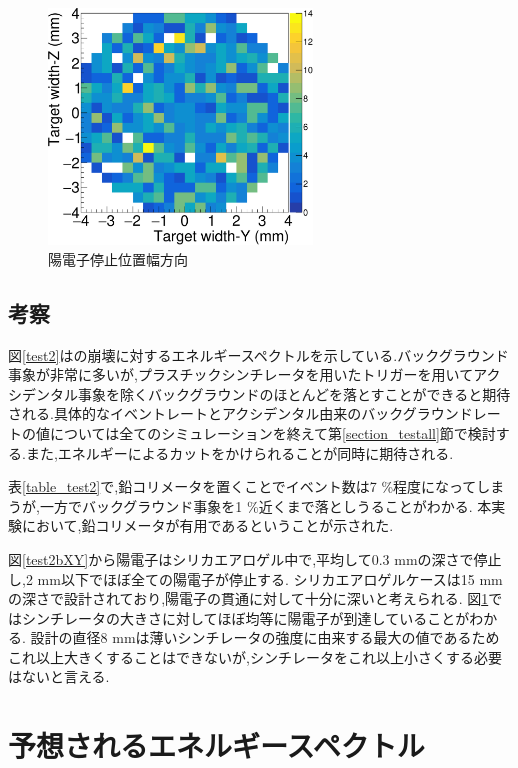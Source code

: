 \begin{figure}[htbp]
	\centering
		\includegraphics[width=7cm]{fig/test2bYZ.pdf}
	\caption{陽電子停止位置幅方向}
	\label{test2bYZ}
\end{figure}

\subsection{考察}

図\ref{test2}はの崩壊に対するエネルギースペクトルを示している.バックグラウンド事象が非常に多いが,プラスチックシンチレータを用いたトリガーを用いてアクシデンタル事象を除くバックグラウンドのほとんどを落とすことができると期待される.具体的なイベントレートとアクシデンタル由来のバックグラウンドレートの値については全てのシミュレーションを終えて第\ref{section_testall}節で検討する.また,エネルギーによるカットをかけられることが同時に期待される.

表\ref{table_test2}で,鉛コリメータを置くことでイベント数は7 \%程度になってしまうが,一方でバックグラウンド事象を1 \%近くまで落としうることがわかる.
本実験において,鉛コリメータが有用であるということが示された.

図\ref{test2bXY}から陽電子はシリカエアロゲル中で,平均して0.3 mmの深さで停止し,2 mm以下でほぼ全ての陽電子が停止する.
シリカエアロゲルケースは15 mmの深さで設計されており,陽電子の貫通に対して十分に深いと考えられる.
図\ref{test2bYZ}ではシンチレータの大きさに対してほぼ均等に陽電子が到達していることがわかる.
設計の直径8 mmは薄いシンチレータの強度に由来する最大の値であるためこれ以上大きくすることはできないが,シンチレータをこれ以上小さくする必要はないと言える.


\section{予想されるエネルギースペクトル}
\label{section_test3}

